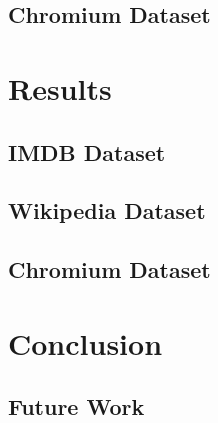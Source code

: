 \documentclass[11pt]{article}
\begin{document}
\subsection*{Chromium Dataset}


\section*{Results}

\subsection*{IMDB Dataset}

\subsection*{Wikipedia Dataset}

\subsection*{Chromium Dataset}


\section*{Conclusion}


\subsection*{Future Work}

\printbibliography
\end{document}
